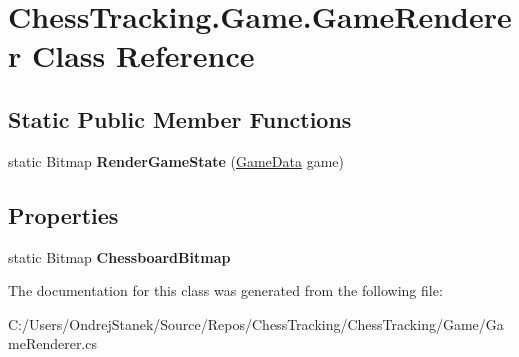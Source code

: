 \hypertarget{class_chess_tracking_1_1_game_1_1_game_renderer}{}\section{Chess\+Tracking.\+Game.\+Game\+Renderer Class Reference}
\label{class_chess_tracking_1_1_game_1_1_game_renderer}
\subsection*{Static Public Member Functions}
\begin{DoxyCompactItemize}
\item 
\mbox{\label{class_chess_tracking_1_1_game_1_1_game_renderer_ace310b80e788fed5eb12efc0c982c4b1}} 
static Bitmap {\bfseries Render\+Game\+State} (\mbox{\hyperlink{class_chess_tracking_1_1_game_1_1_game_data}{Game\+Data}} game)
\end{DoxyCompactItemize}
\subsection*{Properties}
\begin{DoxyCompactItemize}
\item 
\mbox{\label{class_chess_tracking_1_1_game_1_1_game_renderer_ad9c5f447fb16224410849f5fe3583285}} 
static Bitmap {\bfseries Chessboard\+Bitmap}
\end{DoxyCompactItemize}


The documentation for this class was generated from the following file\+:\begin{DoxyCompactItemize}
\item 
C\+:/\+Users/\+Ondrej\+Stanek/\+Source/\+Repos/\+Chess\+Tracking/\+Chess\+Tracking/\+Game/Game\+Renderer.\+cs\end{DoxyCompactItemize}
